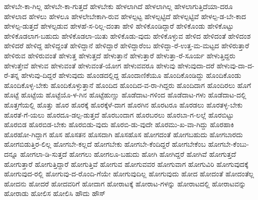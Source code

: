 {ಹೇಳಬೇ-ಕಾ-ಗಿಲ್ಲ
ಹೇಳಬೇ-ಕಾ-ಗುತ್ತದೆ
ಹೇಳಬೇಕು
ಹೇಳಲಾಗಿದೆ
ಹೇಳಲಾಗಿಲ್ಲ
ಹೇಳಲಾಗುತ್ತಿದೆಯಾ-ದರೂ
ಹೇಳಲಾದ
ಹೇಳಲು
ಹೇಳಲೂ
ಹೇಳಲೇಬೇಕಾಗಿ-ರುವ
ಹೇಳಲ್ಪಟ್ಟ
ಹೇಳಲ್ಪಟ್ಟಿದೆ
ಹೇಳಲ್ಪಟ್ಟಿವೆ
ಹೇಳಲ್ಪ-ಡ-ಬೇ-ಕಾದ
ಹೇಳಲ್ಪ-ಡುತ್ತದೆ
ಹೇಳಲ್ಪಡುವ
ಹೇಳಹೆ-ಸ-ರಿಲ್ಲ-ದಂತಾ
ಹೇಳಿ
ಹೇಳಿಕೊಂಡಿದ್ದಾರೆ
ಹೇಳಿಕೊಂಡು
ಹೇಳಿಕೊಟ್ಟು
ಹೇಳಿಕೊಡಲಾಗ-ಬಹುದು
ಹೇಳಿಕೊಡಲಾ-ಯಿತು
ಹೇಳಿಕೊಡು-ವುದು
ಹೇಳಿಕೊಳ್ಳುವ
ಹೇಳಿದ
ಹೇಳಿದಂತೆ
ಹೇಳಿದಂಶ
ಹೇಳಿದರೆ
ಹೇಳಿದ್ದ
ಹೇಳಿದ್ದಂತೆ
ಹೇಳಿದ್ದಾನೆ
ಹೇಳಿದ್ದಾರೆ
ಹೇಳಿದ್ದಾರೆಂಬ
ಹೇಳಿದ್ದಾ-ರೆ-ಉತ್ತ-ಮ-ಮಟ್ಟದ
ಹೇಳಿರುತ್ತಾರೆ
ಹೇಳಿರುವ
ಹೇಳಿರುವಂತೆ
ಹೇಳುತ್ತ
ಹೇಳುತ್ತದೆ
ಹೇಳುತ್ತಾನೆ
ಹೇಳುತ್ತಾರೆ
ಹೇಳುತ್ತಾ-ರೆ-ಸೂರ್ಯ
ಹೇಳುತ್ತಿದ್ದರು
ಹೇಳುತ್ತೇವೆ
ಹೇಳುವ
ಹೇಳುವಂತೆ
ಹೇಳುವಂತೆ-ಯೋಗ
ಹೇಳುವವರೂ
ಹೇಳುವು
ಹೇಳುವುದಾ-ದರೆ
ಹೇಳುವು-ದಾ-ದ-ರೆ-ತನ್ನ
ಹೇಳುವು-ದಿದ್ದರೆ
ಹೇಳುವುದು
ಹೊಂಡದಲ್ಲಿದ್ದ
ಹೊಂದಾಣಿಕೆಯೂ
ಹೊಂದಿಕೊಂಡಿದ್ದು
ಹೊಂದಿಕೊಂಡು
ಹೊಂದಿಕೊಳ್ಳ-ಬೇಕು
ಹೊಂದಿಕೊಳ್ಳುತ್ತಾನೆ
ಹೊಂದಿದ
ಹೊಂದಿದ-ವ-ರಾ-ಗಿದ್ದರು
ಹೊಂದಿದಾಗ
ಹೊಂದಿರಲು
ಹೊಗೆ
ಹೊಟ್ಟೆ
ಹೊಟ್ಟೆಯ
ಹೊಟ್ಟೆಯೊ-ಳ-ಗಿನ
ಹೊಟ್ಟೆಹುಣ್ಣು
ಹೊಡೆದಾಟ-ಗಳಿಂದ
ಹೊಡೆದಾಟ-ಗಳು
ಹೊಡೆದಾಟ-ದಲ್ಲಿ
ಹೊತ್ತಗೆಯಲ್ಲಿ
ಹೊತ್ತು
ಹೊರ
ಹೊರಕ್ಕೆ
ಹೊರಕ್ಕೆಳೆ-ದಾಗ
ಹೊರಗಿನ
ಹೊರಟರೂ
ಹೊರಡಲು
ಹೊರತಳ್ಳ-ಬೇಕು
ಹೊರತೆ-ಗೆ-ಯಲು
ಹೊರದೂ-ಡಲ್ಪ-ಡುತ್ತದೆ
ಹೊರಬಂದಾಗ
ಹೊರಬರಲು
ಹೊರಬಾ-ಗ-ಲಲ್ಲೆ
ಹೊರಬಿಟ್ಟು
ಹೊರಬಿಡ
ಹೊರಬಿಡ-ಬೇಕು
ಹೊರಬಿಡು-ವುದು
ಹೊರಬಿ-ಡು-ವುದೇ
ಹೊರಮು-ಖ-ವಾ-ಗಿದ್ದು
ಹೊರಹಾಕಿ
ಹೊರಹೋ-ಗಿದ್ದಾಗ
ಹೊಸ
ಹೊಸತನ
ಹೊಸದಾಗಿ
ಹೊಸಹೊಸ
ಹೋಗದಂತೆ
ಹೋಗಬಹುದು
ಹೋಗಬಾರದು
ಹೋಗಬಿಡುತ್ತಿರ-ಲಿಲ್ಲ
ಹೋಗಬೇ-ಕಲ್ಲದೆ
ಹೋಗಬೇಕು
ಹೋಗಬೇ-ಕೆಂದಿದ್ದರೆ
ಹೋಗಬೇಕೆಂಬ
ಹೋಗಬೇ-ಕೆಂಬು-ದನ್ನೂ
ಹೋಗಲಾ-ಡಿ-ಸುತ್ತದೆ
ಹೋಗಲು
ಹೋಗಲೂ-ಬಹುದು
ಹೋಗಿ
ಹೋಗಿದ್ದರೆ
ಹೋಗಿವೆ
ಹೋಗುತ್ತದೆ
ಹೋಗುತ್ತಾರೆ
ಹೋಗುತ್ತಿದ್ದಾರೆ
ಹೋಗುತ್ತಿವೆ
ಹೋಗುವ
ಹೋಗುವವರ
ಹೋಗುವಾಗ
ಹೋಗುವಿರಿ
ಹೋಗುವುದಕ್ಕೆ
ಹೋಗುವುದ-ರಲ್ಲಿ
ಹೋಗುವು-ದ-ರೊಂದಿ-ಗೆಯೇ
ಹೋಗುವುದಿಲ್ಲ
ಹೋಗುವುದು
ಹೋದ
ಹೋದಂತೆ
ಹೋದಂತೆಲ್ಲ
ಹೋದನು
ಹೋದರೆ
ಹೋದವರಿಗೆ
ಹೋದಾಗ
ಹೋರಾಟಕ್ಕೆ
ಹೋರಾಟ-ಗಳನ್ನು
ಹೋರಾಟದಲ್ಲಿ
ಹೋರಾಟವನ್ನು
ಹೋರಾಡು
ಹೋಲಿಸ
ಹೋಲಿಸಿ
ಹೌದು
ಹೌಸ್
}
